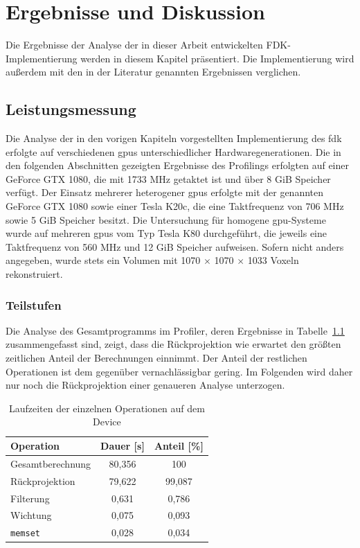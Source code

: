 \chapter{Ergebnisse und Diskussion}

Die Ergebnisse der Analyse der in dieser Arbeit entwickelten FDK-Implementierung werden in diesem Kapitel präsentiert.
Die Implementierung wird außerdem mit den in der Literatur genannten Ergebnissen verglichen.

\section{Leistungsmessung}

Die Analyse der in den vorigen Kapiteln vorgestellten Implementierung des \gls{fdk} erfolgte auf verschiedenen
\gls{gpu}s unterschiedlicher Hardwaregenerationen. Die in den folgenden Abschnitten gezeigten Ergebnisse des Profilings
erfolgten auf einer GeForce GTX 1080, die mit 1733 MHz getaktet ist und über 8 GiB Speicher verfügt. Der Einsatz
mehrerer heterogener \gls{gpu}s erfolgte mit der genannten GeForce GTX 1080 sowie einer Tesla K20c, die eine
Taktfrequenz von 706 MHz sowie 5 GiB Speicher besitzt. Die Untersuchung für homogene \gls{gpu}-Systeme wurde auf
mehreren \gls{gpu}s vom Typ Tesla K80 durchgeführt, die jeweils eine Taktfrequenz von 560 MHz und 12 GiB Speicher
aufweisen. Sofern nicht anders angegeben, wurde stets ein Volumen mit 1070 $\times$ 1070 $\times$ 1033 Voxeln
rekonstruiert.

\subsection{Teilstufen}

Die Analyse des Gesamtprogramms im Profiler, deren Ergebnisse in Tabelle~\ref{tab:op_runtime} zusammengefasst sind,
zeigt, dass die Rückprojektion wie erwartet den größten zeitlichen Anteil der Berechnungen einnimmt. Der Anteil der
restlichen Operationen ist dem gegenüber vernachlässigbar gering. Im Folgenden wird daher nur noch die Rückprojektion
einer genaueren Analyse unterzogen.

\begin{table}
    \centering
    \begin{tabular}{lcc}
        \hline
        Operation & Dauer [s] & Anteil [\%]\\
        \hline
        Gesamtberechnung & 80,356 & 100\\
        Rückprojektion & 79,622 & 99,087\\
        Filterung & 0,631 & 0,786\\
        Wichtung & 0,075 & 0,093 \\
        \texttt{memset} & 0,028 & 0,034\\
        \hline
    \end{tabular}
    \caption{Laufzeiten der einzelnen Operationen auf dem Device\label{tab:op_runtime}}
\end{table}

